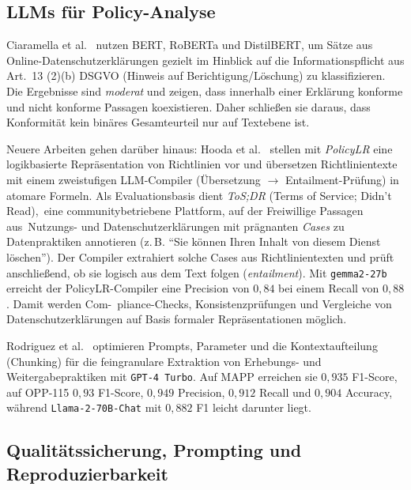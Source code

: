 \subsection*{\acp{LLM} für Policy-Analyse}

Ciaramella et al.\ \cite{ciaramella2022leveraging} nutzen BERT, RoBERTa und DistilBERT, um Sätze aus Online-Datenschutzerklärungen gezielt im Hinblick auf die Informationspflicht aus Art.~13 (2)(b) \ac{DSGVO} (Hinweis auf Berichtigung/Löschung) zu klassifizieren. Die Ergebnisse sind \emph{moderat} und zeigen, dass innerhalb einer Erklärung konforme und nicht konforme Passagen koexistieren. Daher schließen sie daraus, dass Konformität kein binäres Gesamteurteil nur auf Textebene ist.

Neuere Arbeiten gehen darüber hinaus: Hooda et al.\ \cite{hooda2024policylr} stellen mit \emph{PolicyLR} eine logikbasierte Repräsentation von Richtlinien vor und übersetzen Richtlinientexte mit einem zweistufigen \ac{LLM}-Compiler (Übersetzung $\to$ Entailment-Prüfung) in atomare Formeln. Als Evaluationsbasis dient \emph{ToS;DR} (Terms of Service; Didn’t Read),\linebreak~eine communitybetriebene Plattform, auf der Freiwillige Passagen aus\linebreak~Nutzungs- und Datenschutzerklärungen mit prägnanten \emph{Cases} zu Datenpraktiken annotieren (z.\,B. \enquote{Sie können Ihren Inhalt von diesem Dienst löschen}). Der Compiler extrahiert solche Cases aus Richtlinientexten und prüft anschließend, ob sie logisch aus dem Text folgen (\emph{entailment}). Mit \texttt{gemma2-27b} erreicht der PolicyLR-Compiler eine Precision von $0{,}84$ bei einem Recall von $0{,}88$. Damit werden Com-\linebreak~pliance-Checks, Konsistenzprüfungen und Vergleiche von Datenschutzerklärungen auf Basis formaler Repräsentationen möglich.

Rodriguez et al.\ \cite{rodriguez2024largelanguagemodels} optimieren Prompts, Parameter und die Kontextaufteilung (Chunking) für die feingranulare Extraktion von Erhebungs- und Weitergabepraktiken mit \texttt{GPT-4~Turbo}. Auf MAPP erreichen sie $0{,}935$ F1-Score, auf OPP-115 $0{,}93$ F1-Score, $0{,}949$ Precision, $0{,}912$ Recall und $0{,}904$ Accuracy, während \texttt{Llama-2-70B-Chat} mit $0{,}882$ F1 leicht darunter liegt.

\subsection*{Qualitätssicherung, Prompting und Reproduzierbarkeit}

